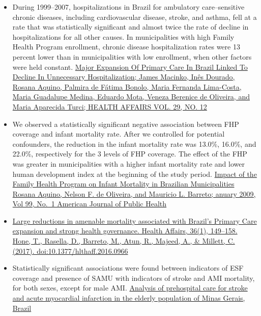 \documentclass[]{book}
\begin{document}
\begin{itemize}
\item
  During 1999--2007, hospitalizations in Brazil for ambulatory care--sensitive chronic diseases, including cardiovascular disease, stroke, and asthma, fell at a rate that was statistically significant and almost twice the rate of decline in hospitalizations for all other causes. In municipalities with high Family Health Program enrollment, chronic disease hospitalization rates were 13 percent lower than in municipalities with low enrollment, when other factors were held constant. \href{https://www.healthaffairs.org/doi/full/10.1377/hlthaff.2010.0251}{Major Expansion Of Primary Care In Brazil Linked To Decline In Unnecessary Hospitalization; James Macinko, Inês Dourado, Rosana Aquino, Palmira de Fátima Bonolo, Maria Fernanda Lima-Costa, Maria Guadalupe Medina, Eduardo Mota, Veneza Berenice de Oliveira, and Maria Aparecida Turci; HEALTH AFFAIRS VOL. 29, NO. 12}
\item
  We observed a statistically significant negative association between FHP coverage and infant mortality rate. After we controlled for potential confounders, the reduction in the infant mortality rate was 13.0\%, 16.0\%, and 22.0\%, respectively for the 3 levels of FHP coverage. The effect of the FHP was greater in municipalities with a higher infant mortality rate and lower human development index at the beginning of the study period. \href{https://www.ncbi.nlm.nih.gov/pmc/articles/PMC2636620/pdf/87.pdf}{Impact of the Family Health Program on Infant Mortality in Brazilian Municipalities Rosana Aquino, Nelson F. de Oliveira, and Mauricio L. Barreto; anuary 2009, Vol 99, No.~1 \textbar{} American Journal of Public Health}
\item
  \href{https://www.healthaffairs.org/doi/full/10.1377/hlthaff.2016.0966?url_ver=Z39.88-2003\&rfr_id=ori:rid:crossref.org\&rfr_dat=cr_pub\%3dpubmed}{Large reductions in amenable mortality associated with Brazil's Primary Care expansion and strong health governance. Health Affairs, 36(1), 149--158. Hone, T., Rasella, D., Barreto, M., Atun, R., Majeed, A., \& Millett, C. (2017). doi:10.1377/hlthaff.2016.0966}
\item
  Statistically significant associations were found between indicators of ESF coverage and presence of SAMU with indicators of stroke and AMI mortality, for both sexes, except for male AMI. \href{http://www.scielo.br/pdf/ramb/v56n4/en_19.pdf}{Analysis of prehospital care for stroke and acute myocardial infarction in the elderly population of Minas Gerais, Brazil}

\end{itemize}
\end{document}
